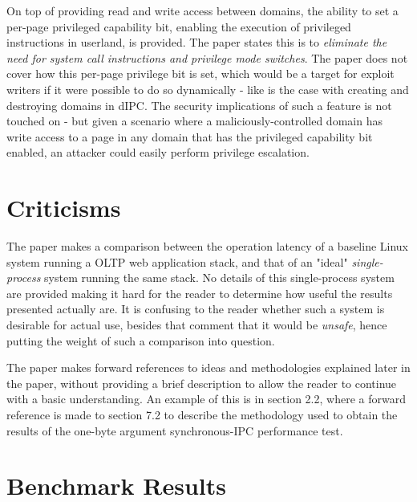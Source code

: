 \documentclass{article}
\begin{document}
On top of providing read and write access between domains, the ability to set a per-page privileged capability bit, enabling the execution of privileged instructions in userland, is provided. The paper states this is to \textit{eliminate the need for system call instructions and privilege mode switches}. The paper does not cover how this per-page privilege bit is set, which would be a target for exploit writers if it were possible to do so dynamically - like is the case with creating and destroying domains in dIPC. The security implications of such a feature is not touched on - but given a scenario where a maliciously-controlled domain has write access to a page in any domain that has the privileged capability bit enabled, an attacker could easily perform privilege escalation.


\section*{Criticisms}
The paper makes a comparison between the operation latency of a baseline Linux system running a OLTP web application stack, and that of an "ideal" \textit{single-process} system running the same stack. No details of this single-process system are provided making it hard for the reader to determine how useful the results presented actually are. It is confusing to the reader whether such a system is desirable for actual use, besides that comment that it would be \textit{unsafe}, hence putting the weight of such a comparison into question.

The paper makes forward references to ideas and methodologies explained later in the paper, without providing a brief description to allow the reader to continue with a basic understanding. An example of this is in section 2.2, where a forward reference is made to section 7.2 to describe the methodology used to obtain the results of the one-byte argument synchronous-IPC performance test.



\section*{Benchmark Results}

\nocite{*}


\end{document}

